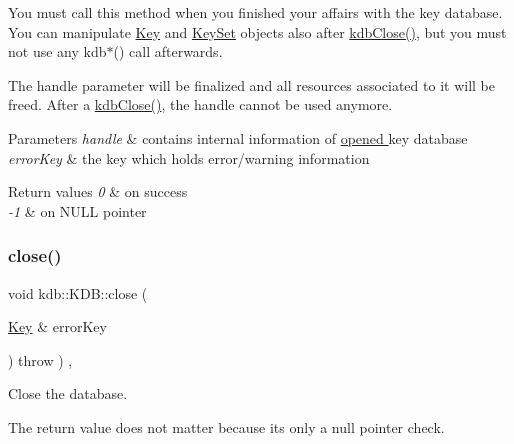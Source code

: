 You must call this method when you finished your affairs with the key database. You can manipulate \hyperlink{classkdb_1_1Key}{Key} and \hyperlink{classkdb_1_1KeySet}{Key\+Set} objects also after \hyperlink{group__kdb_gadb54dc9fda17ee07deb9444df745c96f}{kdb\+Close()}, but you must not use any kdb$\ast$() call afterwards.

The {\ttfamily handle} parameter will be finalized and all resources associated to it will be freed. After a \hyperlink{group__kdb_gadb54dc9fda17ee07deb9444df745c96f}{kdb\+Close()}, the {\ttfamily handle} cannot be used anymore.


\begin{DoxyParams}{Parameters}
{\em handle} & contains internal information of \hyperlink{group__kdb_ga6808defe5870f328dd17910aacbdc6ca}{opened } key database \\
\hline
{\em error\+Key} & the key which holds error/warning information \\
\hline
\end{DoxyParams}

\begin{DoxyRetVals}{Return values}
{\em 0} & on success \\
\hline
{\em -\/1} & on N\+U\+LL pointer \\
\hline
\end{DoxyRetVals}
\mbox{\label{classkdb_1_1KDB_aa027a8f798a2cfee11ff712eb204c35d}} 
\subsubsection{\texorpdfstring{close()}{close()}\hspace{0.1cm}{\footnotesize\ttfamily [2/2]}}
{\footnotesize\ttfamily void kdb\+::\+K\+D\+B\+::close (\begin{DoxyParamCaption}\item[{\hyperlink{classkdb_1_1Key}{Key} \&}]{error\+Key }\end{DoxyParamCaption}) throw  ) \hspace{0.3cm}{\ttfamily [inline]}, {\ttfamily [virtual]}}



Close the database. 

The return value does not matter because its only a null pointer check.


